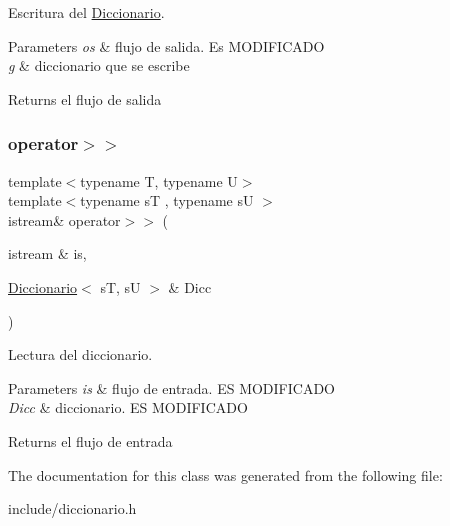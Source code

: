 Escritura del \hyperlink{classDiccionario}{Diccionario}. 


\begin{DoxyParams}{Parameters}
{\em os} & flujo de salida. Es M\+O\+D\+I\+F\+I\+C\+A\+DO \\
\hline
{\em g} & diccionario que se escribe \\
\hline
\end{DoxyParams}
\begin{DoxyReturn}{Returns}
el flujo de salida 
\end{DoxyReturn}
\mbox{\label{classDiccionario_af7dfe37556742720054f190ae78cc676}} 
\subsubsection{\texorpdfstring{operator$>$$>$}{operator>>}}
{\footnotesize\ttfamily template$<$typename T, typename U$>$ \\
template$<$typename sT , typename sU $>$ \\
istream\& operator$>$$>$ (\begin{DoxyParamCaption}\item[{istream \&}]{is,  }\item[{\hyperlink{classDiccionario}{Diccionario}$<$ sT, sU $>$ \&}]{Dicc }\end{DoxyParamCaption})\hspace{0.3cm}{\ttfamily [friend]}}



Lectura del diccionario. 


\begin{DoxyParams}{Parameters}
{\em is} & flujo de entrada. ES M\+O\+D\+I\+F\+I\+C\+A\+DO \\
\hline
{\em Dicc} & diccionario. ES M\+O\+D\+I\+F\+I\+C\+A\+DO \\
\hline
\end{DoxyParams}
\begin{DoxyReturn}{Returns}
el flujo de entrada 
\end{DoxyReturn}


The documentation for this class was generated from the following file\+:\begin{DoxyCompactItemize}
\item 
include/diccionario.\+h\end{DoxyCompactItemize}
